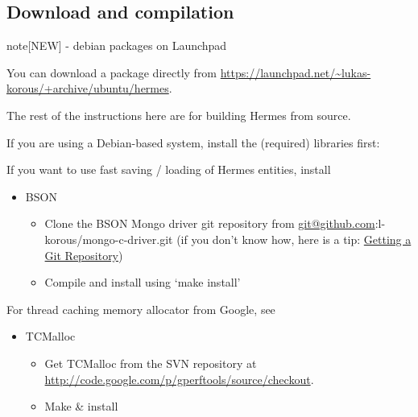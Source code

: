 \documentclass[a4paper,0pt,english]{sphinxmanual}
\let\origfigure=\figure
\renewenvironment{figure}[6]{
\origfigure[H]}
{\endlist}
\begin{document}
\subsection{Download and compilation}
\label{src/installation/linux:download-and-compilation}\begin{figure}[htbp]
\centering

\end{figure}

\begin{notice}{note}{{[}NEW{]} - debian packages on Launchpad}

You can download a package directly from \href{https://launchpad.net/~lukas-korous/+archive/ubuntu/hermes}{https://launchpad.net/\textasciitilde{}lukas-korous/+archive/ubuntu/hermes}.
\end{notice}
\begin{figure}[htbp]
\centering

\end{figure}

The rest of the instructions here are for building Hermes from source.

If you are using a Debian-based system, install the (required) libraries first:

If you want to use fast saving / loading of Hermes entities, install
\begin{itemize}
\item {} 
BSON
\begin{itemize}
\item {} 
Clone the BSON Mongo driver git repository from \href{mailto:git@github.com}{git@github.com}:l-korous/mongo-c-driver.git (if you don't know how, here is a tip: \href{http://git-scm.com/book/en/Git-Basics-Getting-a-Git-Repository}{Getting a Git Repository})

\item {} 
Compile and install using `make install'

\end{itemize}

\end{itemize}

For thread caching memory allocator from Google, see
\begin{itemize}
\item {} 
TCMalloc
\begin{itemize}
\item {} 
Get TCMalloc from the SVN repository at \href{http://code.google.com/p/gperftools/source/checkout}{http://code.google.com/p/gperftools/source/checkout}.

\item {} 
Make \& install

\end{itemize}

\end{itemize}
\end{document}
